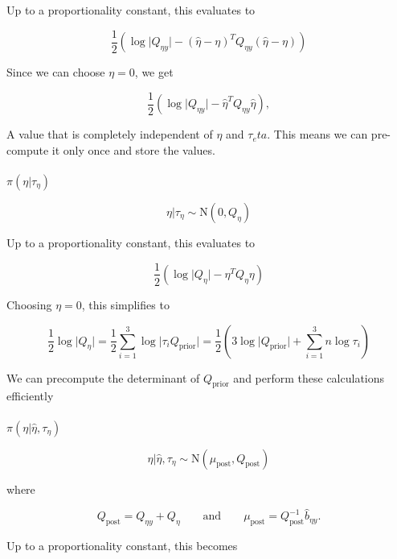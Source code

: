 \documentclass[
  letterpaper,
  DIV=11,
  numbers=noendperiod]{scrartcl}
\makeatletter
\let\oldparagraph\paragraph
\renewcommand{\paragraph}{
    \@ifstar
      \xxxParagraphStar
      \xxxParagraphNoStar
  }
\newcommand{\xxxParagraphStar}[1]{\oldparagraph*{#1}\mbox{}}
\newcommand{\xxxParagraphNoStar}[1]{\oldparagraph{#1}\mbox{}}
\makeatother
\begin{document}
Up to a proportionality constant, this evaluates to

\[
\frac12 \left(\log\vert Q_{\eta y}\vert - (\hat \eta - \eta)^TQ_{\eta y}(\hat \eta - \eta)\right)
\]

Since we can choose \(\eta = 0\), we get

\[
\frac12 \left(\log\vert Q_{\eta y}\vert - \hat \eta^TQ_{\eta y}\hat \eta\right),
\]

A value that is completely independent of \(\eta\) and \(\tau_eta\).
This means we can pre-compute it only once and store the values.

\paragraph{\texorpdfstring{\(\pi(\eta \vert \tau_\eta)\)}{\textbackslash pi(\textbackslash eta \textbackslash vert \textbackslash tau\_\textbackslash eta)}}\label{pieta-vert-tau_eta}

\[
\eta \vert \tau_\eta \sim \mathrm{N}(0, Q_\eta)
\]

Up to a proportionality constant, this evaluates to

\[
\frac12\left(\log\vert Q_\eta\vert - \eta^TQ_\eta\eta\right)
\]

Choosing \(\eta = 0\), this simplifies to

\[
\frac12\log\vert Q_\eta\vert = \frac12  \sum_{i=1}^3\log\vert \tau_i Q_\text{prior}\vert =
\frac12  \left(3 \log\vert Q_\text{prior}\vert + \sum_{i=1}^3 n\log \tau_i\right)
\]

We can precompute the determinant of \(Q_\text{prior}\) and perform
these calculations efficiently

\paragraph{\texorpdfstring{\(\pi(\eta \vert \hat \eta, \tau_\eta)\)}{\textbackslash pi(\textbackslash eta \textbackslash vert \textbackslash hat \textbackslash eta, \textbackslash tau\_\textbackslash eta)}}\label{pieta-vert-hat-eta-tau_eta}

\[
\eta \vert \hat\eta, \tau_\eta \sim \mathrm{N}(\mu_\text{post}, Q_\text{post})
\]

where

\[
Q_{\text{post}} = Q_{\eta y} + Q_\eta
\qquad
\text{and}
\qquad
\mu_{\text{post}} = Q_{\text{post}}^{-1}\hat b_{\eta y}.
\]

Up to a proportionality constant, this becomes
\end{document}
